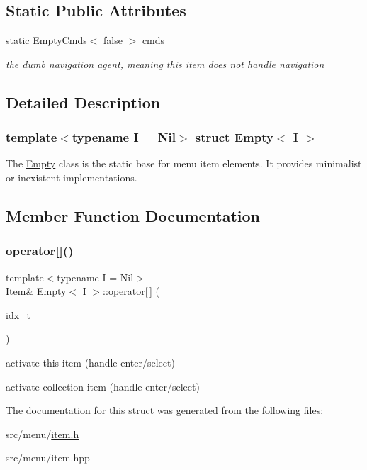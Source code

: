 \subsection*{Static Public Attributes}
\begin{DoxyCompactItemize}
\item 
\mbox{\label{structEmpty_a17b77b2cc02c543127f2db455344f2d3}} 
static \hyperlink{structEmptyCmds}{Empty\+Cmds}$<$ false $>$ \hyperlink{structEmpty_a17b77b2cc02c543127f2db455344f2d3}{cmds}
\begin{DoxyCompactList}\small\item\em the dumb navigation agent, meaning this item does not handle navigation \end{DoxyCompactList}\end{DoxyCompactItemize}


\subsection{Detailed Description}
\subsubsection*{template$<$typename I = Nil$>$\newline
struct Empty$<$ I $>$}

The \hyperlink{structEmpty}{Empty} class is the static base for menu item elements. It provides minimalist or inexistent implementations. 

\subsection{Member Function Documentation}
\mbox{\label{structEmpty_a773bc9093a9594a8227141c9f4f0618f}} 
\subsubsection{\texorpdfstring{operator[]()}{operator[]()}}
{\footnotesize\ttfamily template$<$typename I  = Nil$>$ \\
\hyperlink{structItem}{Item}\& \hyperlink{structEmpty}{Empty}$<$ I $>$\+::operator\mbox{[}$\,$\mbox{]} (\begin{DoxyParamCaption}\item[{idx\+\_\+t}]{ }\end{DoxyParamCaption})\hspace{0.3cm}{\ttfamily [inline]}}



activate this item (handle enter/select) 

activate collection item (handle enter/select) 

The documentation for this struct was generated from the following files\+:\begin{DoxyCompactItemize}
\item 
src/menu/\hyperlink{item_8h}{item.\+h}\item 
src/menu/item.\+hpp\end{DoxyCompactItemize}
